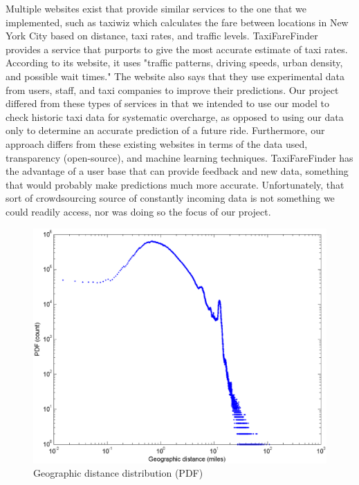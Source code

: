 \documentclass{sig-alternate}
\begin{document}
Multiple websites exist that provide similar services to the one that we implemented, such as taxiwiz which calculates the fare between locations in New York City based on distance, taxi rates, and traffic levels.  TaxiFareFinder provides a service that purports to give the most accurate estimate of taxi rates.  According to its website, it uses "traffic patterns, driving speeds, urban density, and possible wait times."  The website also says that they use experimental data from users, staff, and taxi companies to improve their predictions.  Our project differed from these types of services in that we intended to use our model to check historic taxi data for systematic overcharge, as opposed to using our data only to determine an accurate prediction of a future ride.  Furthermore, our approach differs from these existing websites in terms of the data used, transparency (open-source), and machine learning techniques.  TaxiFareFinder has the advantage of a user base that can provide feedback and new data, something that would probably make predictions much more accurate\cite{taxifarefinder}.  Unfortunately, that sort of crowdsourcing source of constantly incoming data is not something we could readily access, nor was doing so the focus of our project.
\begin{figure}
\includegraphics[scale=.19]{dpdf.eps}
\caption{Geographic distance distribution (PDF)}
\end{figure}
\end{document}
